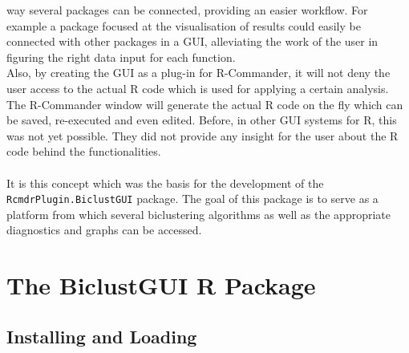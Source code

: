 \documentclass[a4paper]{article}\usepackage[]{graphicx}\usepackage[]{color}
\begin{document}
way several packages can be connected, providing an easier workflow. For
example a package focused at the visualisation of results could easily be
connected with other packages in a GUI, alleviating the work of the user in
figuring the right data input for each function.\\
Also, by creating the GUI as a plug-in for R-Commander, it will not deny the
user access to the actual R code which is used for applying a certain analysis.
The R-Commander window will generate the actual R code on the fly which can be
saved, re-executed and even edited. Before, in other GUI systems for R, this was
not yet possible. They did not provide any insight for the user about the R code
behind the functionalities.
\\ \\
It is this concept which was the basis for the development of the
\verb|RcmdrPlugin.BiclustGUI| package. The goal of this package is to serve
as a platform from which several biclustering algorithms as well as the
appropriate diagnostics and graphs can be accessed.


\newpage
\section{The BiclustGUI R Package}
\subsection{Installing and Loading}
\end{document}
